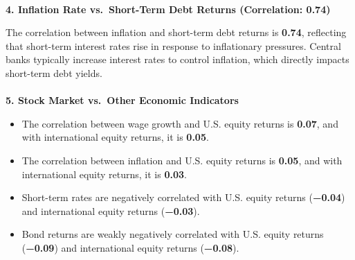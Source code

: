 \documentclass[
  letterpaper,
  DIV=11,
  numbers=noendperiod]{scrartcl}
\makeatletter
\let\oldparagraph\paragraph
\renewcommand{\paragraph}{
    \@ifstar
      \xxxParagraphStar
      \xxxParagraphNoStar
  }
\newcommand{\xxxParagraphStar}[1]{\oldparagraph*{#1}\mbox{}}
\newcommand{\xxxParagraphNoStar}[1]{\oldparagraph{#1}\mbox{}}
\makeatother
\begin{document}
\paragraph{\texorpdfstring{\textbf{4. Inflation Rate vs.~Short-Term Debt
Returns (Correlation:
0.74)}}{4. Inflation Rate vs.~Short-Term Debt Returns (Correlation: 0.74)}}\label{inflation-rate-vs.-short-term-debt-returns-correlation-0.74}

The correlation between inflation and short-term debt returns is
\textbf{0.74}, reflecting that short-term interest rates rise in
response to inflationary pressures. Central banks typically increase
interest rates to control inflation, which directly impacts short-term
debt yields.

\paragraph{\texorpdfstring{\textbf{5. Stock Market vs.~Other Economic
Indicators}}{5. Stock Market vs.~Other Economic Indicators}}\label{stock-market-vs.-other-economic-indicators}

\begin{itemize}
\item
  The correlation between wage growth and U.S. equity returns is
  \textbf{0.07}, and with international equity returns, it is
  \textbf{0.05}.
\item
  The correlation between inflation and U.S. equity returns is
  \textbf{0.05}, and with international equity returns, it is
  \textbf{0.03}.
\item
  Short-term rates are negatively correlated with U.S. equity returns
  (\textbf{−0.04}) and international equity returns (\textbf{−0.03}).
\item
  Bond returns are weakly negatively correlated with U.S. equity returns
  (\textbf{−0.09}) and international equity returns (\textbf{−0.08}).
\end{itemize}
\end{document}
